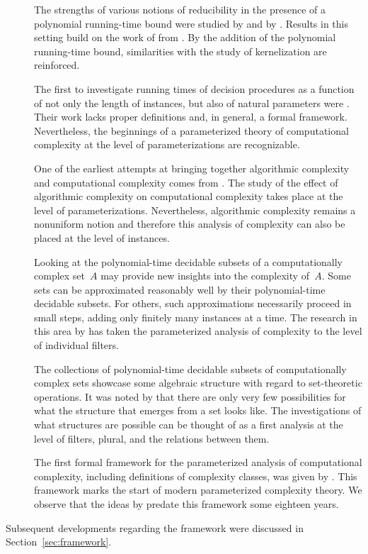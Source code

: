 \begin{description}
\item[{}]
  The strengths of various notions of reducibility in the presence of a polynomial running-time bound were studied by \citeauthor{selman1979p-selective} and by \citeauthor{meyer1979with}.
  Results in this setting build on the work of \citeauthor{jockusch1968semirecursive} from \citeyear{jockusch1968semirecursive}.
  By the addition of the polynomial running-time bound, similarities with the study of kernelization are reinforced.
\item[]
  The first to investigate running times of decision procedures as a function of not only the length of instances, but also of natural parameters were \citeauthor{garey1979computers}.
  Their work lacks proper definitions and, in general, a formal framework.
  Nevertheless, the beginnings of a parameterized theory of computational complexity at the level of parameterizations are recognizable.
\item[]
  One of the earliest attempts at bringing together algorithmic complexity and computational complexity comes from \citeauthor{hartmanis1983generalized}.
  The study of the effect of algorithmic complexity on computational complexity takes place at the level of parameterizations.
  Nevertheless, algorithmic complexity remains a nonuniform notion and therefore this analysis of complexity can also be placed at the level of instances.
\item[]
  Looking at the polynomial-time decidable subsets of a computationally complex set~$A$ may provide new insights into the complexity of~$A$.
  Some sets can be approximated reasonably well by their polynomial-time decidable subsets.
  For others, such approximations necessarily proceed in small steps, adding only finitely many instances at a time.
  The research in this area by \citeauthor{orponen1985polynomial} has taken the parameterized analysis of complexity to the level of individual filters.
\item[]
  The collections of polynomial-time decidable subsets of computationally complex sets showcase some algebraic structure with regard to set-theoretic operations.
  It was noted by \citeauthor{orponen1986classification} that there are only very few possibilities for what the structure that emerges from a set looks like.
  The investigations of what structures are possible can be thought of as a first analysis at the level of filters, plural, and the relations between them.
\item[]
  The first formal framework for the parameterized analysis of computational complexity, including definitions of complexity classes, was given by \citeauthor{downey1992fixed}.
  This framework marks the start of modern parameterized complexity theory.
  We observe that the ideas by \citeauthor{flajolet1974sets} predate this framework some eighteen years.
\end{description}
Subsequent developments regarding the framework were discussed in Section~\ref{sec:framework}.


